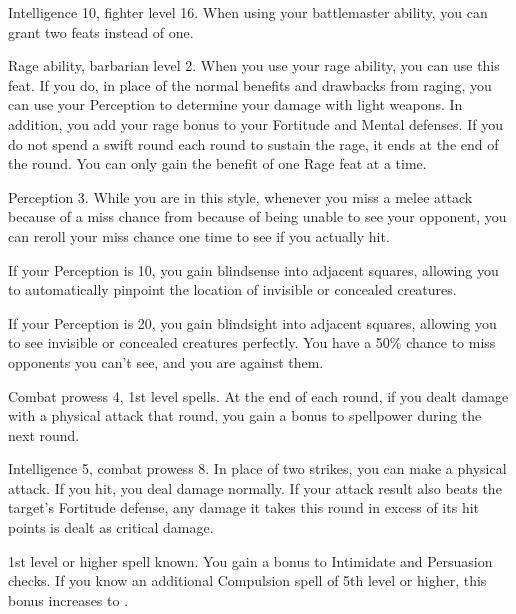 \featpre Intelligence 10, fighter level 16.
\featben When using your battlemaster ability, you can grant two feats instead of one.

\featpre Rage ability, barbarian level 2.
\featben When you use your rage ability, you can use this feat. If you do, in place of the normal benefits and drawbacks from raging, you can use your Perception to determine your damage with light weapons.
In addition, you add your rage bonus to your Fortitude and Mental defenses.
If you do not spend a swift round each round to sustain the rage, it ends at the end of the round.
 You can only gain the benefit of one Rage feat at a time.

\featpre Perception 3.
\featben While you are in this style, whenever you miss a melee attack because of a miss chance from because of being unable to see your opponent, you can reroll your miss chance one time to see if you actually hit.
\par If your Perception is 10, you gain blindsense into adjacent squares, allowing you to automatically pinpoint the location of invisible or concealed creatures.
\par If your Perception is 20, you gain blindsight into adjacent squares, allowing you to see invisible or concealed creatures perfectly.
You have a 50\% chance to miss opponents you can't see, and you are  against them.

\featpres Combat prowess 4, 1st level spells.
\featben At the end of each round, if you dealt damage with a physical attack that round, you gain a  bonus to spellpower during the next round.

\featpre Intelligence 5, combat prowess 8.
\featben In place of two strikes, you can make a physical attack.
If you hit, you deal damage normally.
If your attack result also beats the target's Fortitude defense, any damage it takes this round in excess of its hit points is dealt as critical damage.

\featpre 1st level or higher  spell known.
\featben You gain a  bonus to Intimidate and Persuasion checks.
If you know an additional Compulsion spell of 5th level or higher, this bonus increases to .

